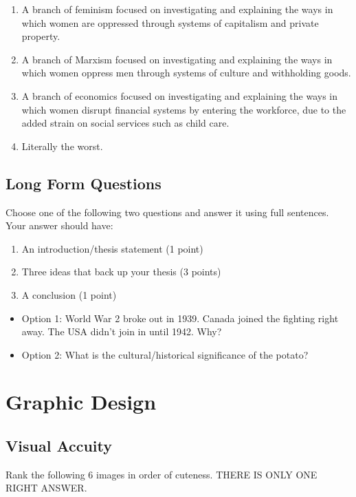 \documentclass[11pt]{exam}
\begin{document}
\begin{questions}
\begin{enumerate}
\begin{enumerate}
\item A branch of feminism focused on investigating and explaining the ways in which women
are oppressed through systems of capitalism and private property.
\item A branch of Marxism focused on investigating and explaining the ways in which women
oppress men through systems of culture and withholding goods.
\item A branch of economics focused on investigating and explaining the ways in which
women disrupt financial systems by entering the workforce, due to the added strain on
social services such as child care.
\item Literally the worst.
\end{enumerate}



\end{enumerate}

\newpage
\subsection{Long Form Questions}
\setcounter{question}{0}
\question Choose one of the following two questions and answer it using full sentences. Your answer should have:
\begin{enumerate}
\item An introduction/thesis statement (1 point)
\item Three ideas that back up your thesis (3 points)
\item A conclusion (1 point)
\end{enumerate}
\begin{itemize}
\item Option 1: World War 2 broke out in 1939. Canada joined the fighting right away. The USA didn’t join in until 1942. Why?
\item Option 2: What is the cultural/historical significance of the potato?
\end{itemize}
\vfill

\newpage
\section{Graphic Design}
\subsection{Visual Accuity}
\setcounter{question}{0}

\question Rank the following 6 images in order of cuteness. THERE IS ONLY ONE RIGHT ANSWER.


\end{questions}
\end{document}
